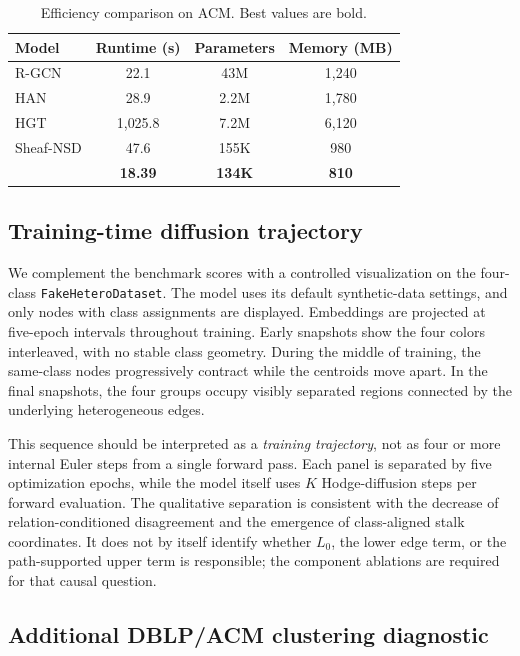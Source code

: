 \begin{table}[H]
  \centering
  \caption{Efficiency comparison on ACM. Best values are bold.}
  \label{tab:efficiency}
  \small
  \begin{tabular}{lccc}
    \toprule
    \textbf{Model} & Runtime (s) & Parameters & Memory (MB) \\
    \midrule
    R-GCN & 22.1 & 43M & 1{,}240 \\
    HAN & 28.9 & 2.2M & 1{,}780 \\
    HGT & 1{,}025.8 & 7.2M & 6{,}120 \\
    Sheaf-NSD & 47.6 & 155K & 980 \\
    \midrule
    \textbf{\method{}} & \textbf{18.39} & \textbf{134K} & \textbf{810} \\
    \bottomrule
  \end{tabular}
\end{table}

\subsection{Training-time diffusion trajectory}
\label{sec:diffusion-analysis}

We complement the benchmark scores with a controlled visualization on the four-class
\texttt{FakeHeteroDataset}. The model uses its default synthetic-data settings, and only nodes with
class assignments are displayed. Embeddings are projected at five-epoch intervals throughout
training. Early snapshots show the four colors interleaved, with no stable class geometry. During
the middle of training, the same-class nodes progressively contract while the centroids move
apart. In the final snapshots, the four groups occupy visibly separated regions connected by the
underlying heterogeneous edges.

This sequence should be interpreted as a \emph{training trajectory}, not as four or more internal
Euler steps from a single forward pass. Each panel is separated by five optimization epochs, while
the model itself uses $K$ Hodge-diffusion steps per forward evaluation. The qualitative separation
is consistent with the decrease of relation-conditioned disagreement and the emergence of
class-aligned stalk coordinates. It does not by itself identify whether $L_0$, the lower edge term,
or the path-supported upper term is responsible; the component ablations are required for that
causal question.

\subsection{Additional DBLP/ACM clustering diagnostic}
\label{sec:additional-clustering}

